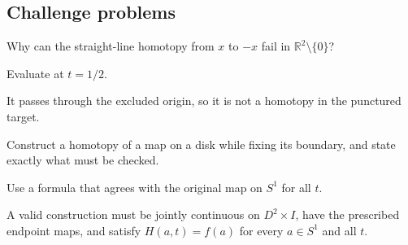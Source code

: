 \subsection*{Challenge problems}

\begin{exercise}\label{exr:viii01-ped-15}
Why can the straight-line homotopy from $x$ to $-x$ fail in $\mathbb R^2\setminus\{0\}$?
\end{exercise}
\begin{hint}
Evaluate at $t=1/2$.
\end{hint}
\begin{solution}
It passes through the excluded origin, so it is not a homotopy in the punctured target.
\end{solution}

\begin{exercise}\label{exr:viii01-ped-16}
Construct a homotopy of a map on a disk while fixing its boundary, and state exactly what must be checked.
\end{exercise}
\begin{hint}
Use a formula that agrees with the original map on $S^1$ for all $t$.
\end{hint}
\begin{solution}
A valid construction must be jointly continuous on $D^2\times I$, have the prescribed endpoint maps, and satisfy $H(a,t)=f(a)$ for every $a\in S^1$ and all $t$.
\end{solution}

